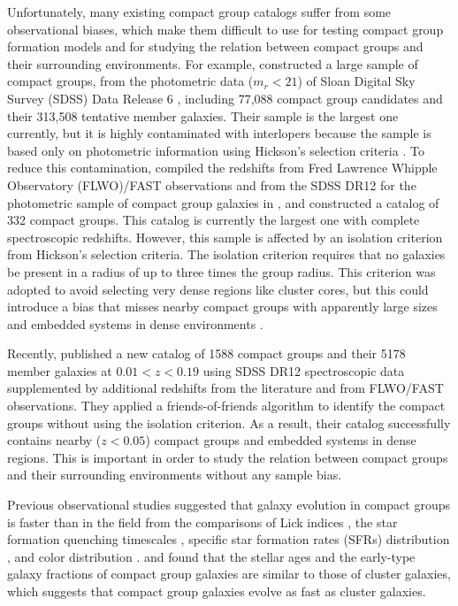 \documentclass[12pt,preprint,apj]{emulateapj}
\begin{document}
Unfortunately, many existing compact group catalogs suffer 
from some observational biases, 
which make them difficult to use for testing compact group formation models 
and for studying the relation between compact groups and their surrounding 
environments. 
For example, \citet{mcconnachie+09} constructed a large sample of 
compact groups, from the photometric data ($m_r<21$) of 
Sloan Digital Sky Survey (SDSS) Data Release 6 \citep[DR6,][]{adelman+08}, 
including 77,088 compact group candidates and their 313,508 tentative member galaxies. 
Their sample is the largest one currently, but it is highly 
contaminated with interlopers \citep[$>50\%$,][]{mendel+11,sohn+13} 
because the sample is based only on photometric information using
Hickson's selection criteria \citep{hickson82}.
To reduce this contamination, \citet{sohn+15} compiled the redshifts from 
Fred Lawrence Whipple Observatory (FLWO)/FAST observations and 
from the SDSS DR12 \citep{alam+15} 
for the photometric sample of compact group galaxies 
in \citet{mcconnachie+09}, and constructed a catalog of 332 compact groups.
This catalog is currently the largest one with complete spectroscopic redshifts.
However, this sample is affected by an isolation criterion
from Hickson's selection criteria.
The isolation criterion requires that no galaxies be present in a radius of up to 
three times the group radius.
This criterion was adopted to avoid selecting very dense regions
like cluster cores, 
but this could introduce a bias that misses nearby compact groups 
with apparently large sizes and embedded systems in dense environments 
\citep{barton+96}.

Recently, \citet{sohn+16} published a new catalog of 1588 compact groups 
and their 5178 member galaxies at $0.01<z<0.19$ using  
SDSS DR12 spectroscopic data supplemented by additional redshifts 
from the literature and from FLWO/FAST observations.
They applied a friends-of-friends algorithm to identify the compact groups 
without using the isolation criterion.
As a result, their catalog successfully contains nearby ($z<0.05$) compact groups 
and embedded systems in dense regions. 
This is important in order to study the relation between compact groups and 
their surrounding environments without any sample bias.

Previous observational studies suggested that galaxy evolution in compact groups 
is faster than in the field from the comparisons of Lick indices 
\citep{proctor+04,mendes+05,de_la_rosa+07}, 
the star formation quenching timescales \citep{plauchu+12}, 
specific star formation rates (SFRs) distribution 
\citep{tzanavaris+10,coenda+15,lenkic+16},
and color distribution \citep{bitsakis+10,bitsakis+11,bitsakis+16,walker+10,walker+12}.
\citet{proctor+04} and \citet{mendes+05} found that 
the stellar ages and the early-type galaxy fractions of compact group galaxies 
are similar to those of cluster galaxies, which suggests that 
compact group galaxies evolve as fast as cluster galaxies.
\end{document}
